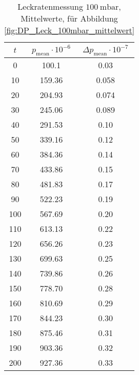 \begin{table}[H]
    \centering
    \caption{Leckratenmessung $\SI{100}{\milli\bar}$, Mittelwerte, für Abbildung \ref{fig:DP_Leck_100mbar_mittelwert}}
    \label{tab:DP_Leck_100mbar_mittelwert}
    \begin{tabular}{c c c}
        \toprule
        {$t$} & {$p_\text{mean} \cdot 10^{-6}$} & {$\Delta p_\text{mean} \cdot 10^{-7}$}\\
        \midrule
        0   & 100.1 & 0.03  \\
        10  & 159.36 & 0.058\\
        20  & 204.93 & 0.074\\
        30  & 245.06 & 0.089\\
        40  & 291.53 & 0.10 \\
        50  & 339.16 & 0.12 \\
        60  & 384.36 & 0.14 \\
        70  & 433.86 & 0.15 \\
        80  & 481.83 & 0.17 \\
        90  & 522.23 & 0.19 \\
        100 & 567.69 & 0.20 \\
        110 & 613.13 & 0.22 \\
        120 & 656.26 & 0.23 \\
        130 & 699.63 & 0.25 \\
        140 & 739.86 & 0.26 \\
        150 & 778.70 & 0.28 \\
        160 & 810.69 & 0.29 \\
        170 & 844.23 & 0.30 \\
        180 & 875.46 & 0.31 \\
        190 & 903.36 & 0.32 \\
        200 & 927.36 & 0.33 \\
        \bottomrule
    \end{tabular}
\end{table}

